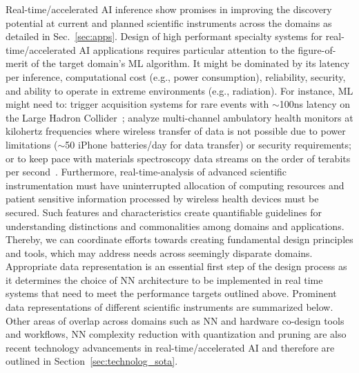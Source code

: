 \noindent 
Real-time/accelerated AI inference show promises in improving the discovery potential at current and planned scientific instruments across the domains as detailed in Sec.~\ref{sec:apps}. Design of high performant specialty systems for real-time/accelerated AI applications requires particular attention to the figure-of-merit of the target domain's ML algorithm. 
It might be dominated by its latency per inference, computational cost (e.g., power consumption), reliability, security, and ability to operate in extreme environments (e.g., radiation). 
For instance, ML might need to: trigger acquisition systems for rare events with $\sim$100\unit{ns} latency on the Large Hadron Collider~\cite{Duarte:2018ite}; analyze multi-channel ambulatory health monitors at kilohertz frequencies where wireless transfer of data is not possible due to power limitations ($\sim$50 iPhone batteries/day for data transfer) or security requirements; or to keep pace with materials spectroscopy data streams on the order of terabits per second~\cite{Hart2017-bf}.
Furthermore, real-time-analysis of advanced scientific instrumentation must have uninterrupted allocation of computing resources and patient sensitive information processed by wireless health devices must be secured. Such features and characteristics create quantifiable guidelines for understanding distinctions and commonalities among domains and applications. 
Thereby, we can coordinate efforts towards creating fundamental design principles and tools, which may address needs across seemingly disparate domains. 
Appropriate data representation is an essential first step of the design process as it determines the choice of NN architecture to be implemented in real time systems that need to meet the performance targets outlined above. 
Prominent data representations of different scientific instruments are summarized below. 
Other areas of overlap across domains such as NN and hardware co-design tools and workflows, NN complexity reduction with quantization and pruning are also recent technology advancements in real-time/accelerated AI and therefore are outlined in Section~\ref{sec:technolog_sota}.

